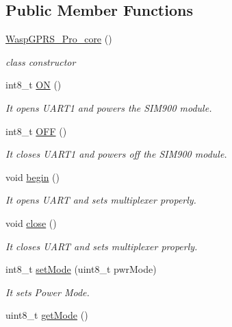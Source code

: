 \subsection*{Public Member Functions}
\begin{DoxyCompactItemize}
\item 
\hyperlink{class_wasp_g_p_r_s___pro__core_a208325254653e60af7bc5a641bd01eab}{Wasp\+G\+P\+R\+S\+\_\+\+Pro\+\_\+core} ()
\begin{DoxyCompactList}\small\item\em class constructor \end{DoxyCompactList}\item 
int8\+\_\+t \hyperlink{class_wasp_g_p_r_s___pro__core_aadc696486b9f21efc90b95b16054f7e4}{ON} ()
\begin{DoxyCompactList}\small\item\em It opens U\+A\+R\+T1 and powers the S\+I\+M900 module. \end{DoxyCompactList}\item 
int8\+\_\+t \hyperlink{class_wasp_g_p_r_s___pro__core_ade7f0f2ebcbd44780ea0476ad7cde380}{O\+FF} ()
\begin{DoxyCompactList}\small\item\em It closes U\+A\+R\+T1 and powers off the S\+I\+M900 module. \end{DoxyCompactList}\item 
void \hyperlink{class_wasp_g_p_r_s___pro__core_a38aab9b0cbf3cfe9d73b600261c9ce8c}{begin} ()
\begin{DoxyCompactList}\small\item\em It opens U\+A\+RT and sets multiplexer properly. \end{DoxyCompactList}\item 
void \hyperlink{class_wasp_g_p_r_s___pro__core_a351df158db7614f00755311200f31595}{close} ()
\begin{DoxyCompactList}\small\item\em It closes U\+A\+RT and sets multiplexer properly. \end{DoxyCompactList}\item 
int8\+\_\+t \hyperlink{class_wasp_g_p_r_s___pro__core_a6b1567da3fc10d6dc944dc3d5bb69361}{set\+Mode} (uint8\+\_\+t pwr\+Mode)
\begin{DoxyCompactList}\small\item\em It sets Power Mode. \end{DoxyCompactList}\item 
uint8\+\_\+t \hyperlink{class_wasp_g_p_r_s___pro__core_aa33dd4f4c753ac5338da80c557a42355}{get\+Mode} ()

\end{DoxyCompactItemize}
